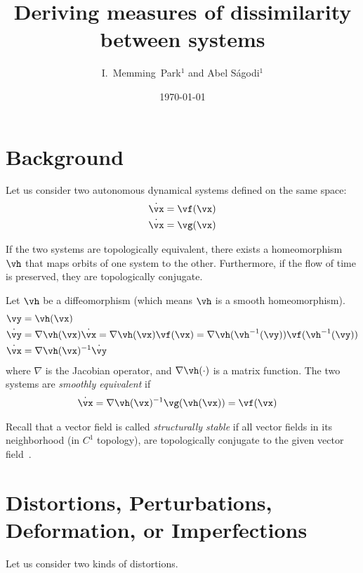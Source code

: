 \documentclass[a4paper,twoside]{article}
\title{Deriving measures of dissimilarity between systems}
\author{
I.~Memming~Park$^{1}$ and
Abel S\'agodi$^{1}$
}
\date{\today}
\newcounter{ct}
\newcommand{\inv}{^{-1}}
\newcommand{\homeo}{\vh}
\newcommand{\invhomeo}{\homeo\inv}
\begin{document}
\maketitle
\thispagestyle{fancy}

\section{Background}
Let us consider two autonomous dynamical systems defined on the same space:
\begin{align}
    \dot{\vx} &= \vf(\vx)
    \\
    \dot{\vx} &= \vg(\vx)
\end{align}

If the two systems are topologically equivalent, there exists a homeomorphism $\homeo$ that maps orbits of one system to the other.
 Furthermore, if the flow of time is preserved, they are topologically conjugate.

Let $\homeo$ be a diffeomorphism (which means $\homeo$ is a smooth homeomorphism).
\begin{align}
    \vy &= \homeo(\vx)
    \\
    \dot{\vy} &=
	\nabla\homeo(\vx)\dot{\vx}
    =
	\nabla\homeo(\vx) \vf(\vx)
    =
	\nabla\homeo(\invhomeo(\vy)) \vf(\invhomeo(\vy))
    \\
    \dot{\vx} &= \nabla\homeo(\vx)\inv \dot{\vy}
\end{align}
where $\nabla$ is the Jacobian operator, and $\nabla\homeo(\cdot)$ is a matrix function.
The two systems are \emph{smoothly equivalent} if
\begin{align}
    \dot{\vx} &= \nabla\homeo(\vx)\inv \vg(\homeo(\vx)) = \vf(\vx)
\end{align}

Recall that a vector field is called \emph{structurally stable} if all vector fields in its neighborhood (in $C^1$ topology), are topologically conjugate to the given vector field~\cite{Chicone2006}.

\section{Distortions, Perturbations, Deformation, or Imperfections}
Let us consider two kinds of distortions.
\end{document}
